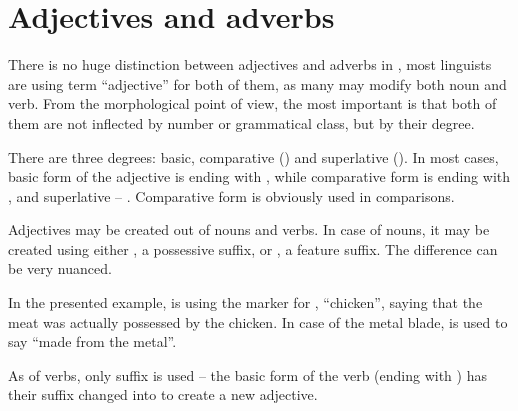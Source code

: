 


\section{Adjectives and adverbs}
\label{sec:morph-adjectives}

There is no huge distinction between adjectives and adverbs in \andro, most
linguists are using term ``adjective'' for both of them, as many may modify both
noun and verb. From the morphological point of view, the most important is that
both of them are not inflected by number or grammatical class, but by their
degree.

There are three degrees: basic, comparative (\Comp{}) and superlative (\Supl{}).
In most cases, basic form of the adjective is ending with , while
comparative form is ending with , and superlative -- .
Comparative form is obviously used in comparisons.


Adjectives may be created out of nouns and verbs. In case of nouns, it may be
created using either , a possessive suffix, or , a feature
suffix. The difference can be very nuanced.



In the presented example,  is using the  marker for
, ``chicken'', saying that the meat was actually possessed by the
chicken. In case of the metal blade,  is used to say ``made from
the metal''.

As of verbs, only  suffix is used -- the basic form of the verb (ending
with ) has their suffix changed into  to create a new adjective.


